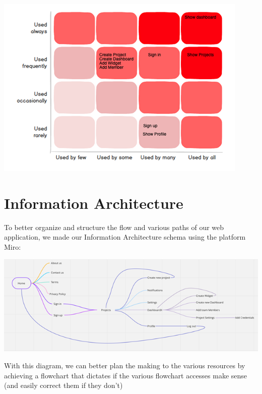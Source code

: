 \documentclass[a4paper,twoside,10pt]{report}
\begin{document}
\begin{center}
    \includegraphics[width=\textwidth]{red-routes-diagram.png}
\end{center}
\newpage

\section{Information Architecture}
To better organize and structure the flow and various paths of our web application, we made our Information Architecture schema using the platform Miro:
\\ \newline
\begin{center}
    \includegraphics[width=\textwidth]{information-architecture.png}
\end{center}

With this diagram, we can better plan the making to the various resources by achieving a flowchart that dictates if the various flowchart accesses make sense (and easily correct them if they don't)
\end{document}
